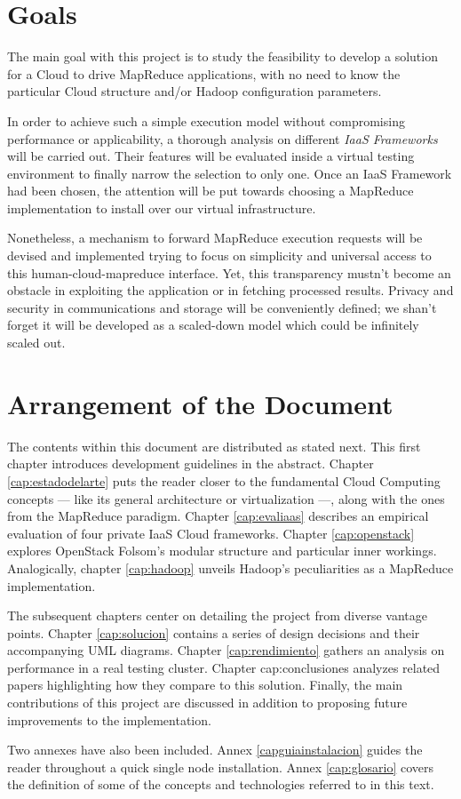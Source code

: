 \section{Goals}\label{sec:objetivos}

\noindent The main goal with this project is to study the feasibility to develop a solution for a Cloud to drive MapReduce applications, with no need to know the particular Cloud structure and/or Hadoop configuration parameters.

In order to achieve such a simple execution model without compromising performance or applicability, a thorough analysis on different \emph{IaaS Frameworks} will be carried out. Their features will be evaluated inside a virtual testing environment to finally narrow the selection to only one. Once an IaaS Framework had been chosen, the attention will be put towards choosing a MapReduce implementation to install over our virtual infrastructure.

Nonetheless, a mechanism to forward MapReduce execution requests will be devised and implemented trying to focus on simplicity and universal access to this human-cloud-mapreduce interface. Yet, this transparency mustn't become an obstacle in exploiting the application or in fetching processed results. Privacy and security in communications and storage will be conveniently defined; we shan't forget it will be developed as a scaled-down model which could be infinitely scaled out.



\section{Arrangement of the Document}\label{sec:organizacion}

\noindent The contents within this document are distributed as stated next. This first chapter introduces development guidelines in the abstract. Chapter \ref{cap:estadodelarte} puts the reader closer to the fundamental Cloud Computing concepts --- like its general architecture or virtualization ---, along with the ones from the MapReduce paradigm. Chapter \ref{cap:evaliaas} describes an empirical evaluation of four private IaaS Cloud frameworks. Chapter \ref{cap:openstack} explores OpenStack Folsom's modular structure and particular inner workings. Analogically, chapter \ref{cap:hadoop} unveils Hadoop's peculiarities as a MapReduce implementation.

The subsequent chapters center on detailing the project from diverse vantage points. Chapter \ref{cap:solucion} contains a series of design decisions and their accompanying UML diagrams. Chapter \ref{cap:rendimiento} gathers an analysis on performance in a real testing cluster. Chapter {cap:conclusiones} analyzes related papers highlighting how they compare to this solution. Finally, the main contributions of this project are discussed in addition to proposing future improvements to the implementation.

Two annexes have also been included. Annex \ref{capguiainstalacion} guides the reader throughout a quick single node installation. Annex \ref{cap:glosario} covers the definition of some of the concepts and technologies referred to in this text.
